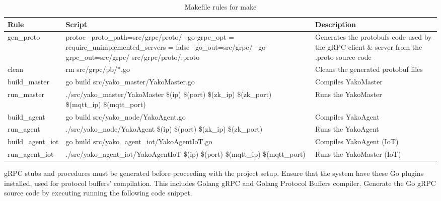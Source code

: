         \begin{table}[H]
            \centering
            \caption{Makefile rules for make}
            \begin{tabularx}{\linewidth}{|l|>{\raggedright}p{70mm}|X|}
            \hline
            \rowcolor[HTML]{C0C0C0}
            \textbf{Rule} & \textbf{Script} & \textbf{Description} \\ \hline
            gen\_proto & protoc --proto\_path=src/grpc/proto/ --go-grpc\_opt = require\_unimplemented\_servers = false --go\_out=src/grpc/ --go-grpc\_out=src/grpc/ src/grpc/proto/\*.proto & Generates the protobufs code used by the gRPC client \& server from the .proto source code \\ \hline
            
            clean & rm src/grpc/pb/*.go & Cleans the generated protobuf files \\ \hline
            
            build\_master & go build src/yako\_master/YakoMaster.go & Compiles YakoMaster \\ \hline
            
            run\_master & ./src/yako\_master/YakoMaster \$(ip) \$(port) \$(zk\_ip) \$(zk\_port) \$(mqtt\_ip) \$(mqtt\_port) & Runs the YakoMaster \\ \hline
            
            build\_agent & go build src/yako\_node/YakoAgent.go & Compiles YakoAgent \\ \hline
            
            run\_agent & ./src/yako\_node/YakoAgent \$(ip) \$(port) \$(zk\_ip) \$(zk\_port) & Runs the YakoAgent \\ \hline
            
            build\_agent\_iot & go build src/yako\_agent\_iot/YakoAgentIoT.go & Compiles YakoAgent (IoT) \\ \hline
            
            run\_agent\_iot & ./src/yako\_agent\_iot/YakoAgentIoT \$(ip) \$(port) \$(mqtt\_ip) \$(mqtt\_port) & Runs the YakoMaster (IoT) \\ \hline
            \end{tabularx}
            \label{tab:yako_make}
        \end{table}
        
            gRPC stubs and procedures must be generated before proceeding with the project setup.
            Ensure that the system have these Go plugins installed, used for protocol buffers' compilation. This includes Golang gRPC and Golang Protocol Buffers compiler. Generate the Go gRPC source code by executing running the following code snippet.

